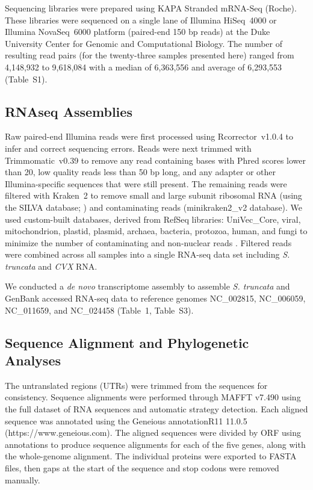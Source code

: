\documentclass[fleqn,10pt,lineno]{wlpeerj}
\begin{document}
Sequencing libraries were prepared using KAPA Stranded mRNA-Seq (Roche).
These libraries were sequenced on a single lane of Illumina \mbox{HiSeq}~4000 or Illumina \mbox{NovaSeq}~6000 platform (paired-end 150 bp reads) at the Duke University Center for Genomic and Computational Biology.
The number of resulting read pairs (for the twenty-three samples presented here) ranged from 4,148,932 to 9,618,084 with a median of 6,363,556 and average of 6,293,553 (Table~S1).

\subsection*{RNAseq Assemblies}

Raw paired-end Illumina reads were first processed using \mbox{Rcorrector}~v1.0.4 \citep{song2015} to infer and correct sequencing errors.
Reads were next trimmed with \mbox{Trimmomatic}~v0.39 \citep{bolger2014} to remove any read containing bases with Phred scores lower than 20, low quality reads less than 50 bp long, and any adapter or other Illumina-specific sequences that were still present.
The remaining reads were filtered with \mbox{Kraken}~2 \citep{wood2019} to remove small and large subunit ribosomal RNA (using the SILVA database; \citealt{quast2013}) and contaminating reads (minikraken2\_v2 database).
We used custom-built databases, derived from RefSeq libraries: UniVec\_Core, viral, mitochondrion, plastid, plasmid, archaea, bacteria, protozoa, human, and fungi to minimize the number of contaminating and non-nuclear reads \citep{ramanauskas2021}.
Filtered reads were combined across all samples into a single RNA-seq data set including \textit{S. truncata} and \textit{CVX} RNA.

We conducted a \textit{de novo} transcriptome assembly to assemble \textit{S. truncata} and GenBank accessed RNA-seq data to reference genomes NC\_002815, NC\_006059, NC\_011659, and NC\_024458 (Table~1, Table~S3).


\subsection*{Sequence Alignment and Phylogenetic Analyses}

The untranslated regions (UTRs) were trimmed from the sequences for consistency.
Sequence alignments were performed through MAFFT v7.490 \citep{katoh_mafft_2002} using the full dataset of RNA sequences and automatic strategy detection. 
Each aligned sequence was annotated using the Geneious annotationR11 11.0.5 (https://www.geneious.com).
The aligned sequences were divided by ORF using annotations to produce sequence alignments for each of the five genes, along with the whole-genome alignment. 
The individual proteins were exported to FASTA files, then gaps at the start of the sequence and stop codons were removed manually. 
\end{document}
